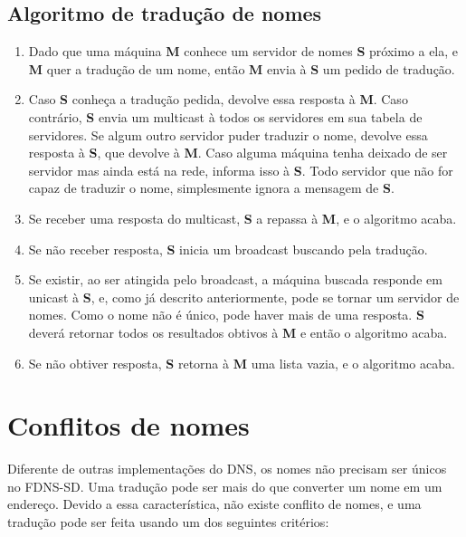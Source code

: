     \subsection{Algoritmo de tradução de nomes}
        \begin{enumerate}
            \item Dado que uma máquina \textbf{M} conhece um servidor de nomes
            \textbf{S} próximo a ela, e \textbf{M} quer a tradução de um nome,
            então \textbf{M} envia à \textbf{S} um pedido de tradução.
            \item Caso \textbf{S} conheça a tradução pedida, devolve essa resposta
            à \textbf{M}. Caso contrário, \textbf{S} envia um multicast à todos
            os servidores em sua tabela de servidores. Se algum outro servidor
            puder traduzir o nome, devolve essa resposta à \textbf{S}, que devolve
            à \textbf{M}. Caso alguma máquina tenha deixado de ser servidor mas
            ainda está na rede, informa isso à \textbf{S}. Todo servidor que não
            for capaz de traduzir o nome, simplesmente ignora a mensagem de \textbf{S}.
            \item Se receber uma resposta do multicast, \textbf{S} a repassa à
            \textbf{M}, e o algoritmo acaba.
            \item Se não receber resposta, \textbf{S} inicia um broadcast buscando
            pela tradução. 
            \item Se existir, ao ser atingida pelo broadcast, a máquina buscada
            responde em unicast à \textbf{S}, e, como já descrito anteriormente,
            pode se tornar um servidor de nomes. Como o nome não é único, pode
            haver mais de uma resposta. \textbf{S} deverá retornar todos os
            resultados obtivos à \textbf{M} e então o algoritmo acaba.
            \item Se não obtiver resposta, \textbf{S} retorna à \textbf{M} uma
            lista vazia, e o algoritmo acaba.
        \end{enumerate}

\section{Conflitos de nomes}
    Diferente de outras implementações do DNS, os nomes não precisam ser únicos
    no FDNS-SD. Uma tradução pode ser mais do que converter um nome em um endereço.
    Devido a essa característica, não existe conflito de nomes, e uma tradução pode
    ser feita usando um dos seguintes critérios:
    
